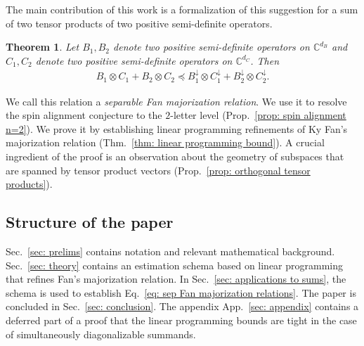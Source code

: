 \documentclass[12pt]{article}
\newtheorem{thm}{Theorem}[section]
\theoremstyle{definition}
\numberwithin{equation}{section}
\numberwithin{equation}{section}
\newcommand{\da}{\downarrow}
\newcommand{\bC}{\mathbb{C}}
\begin{document}
The main contribution of this work is a formalization of this suggestion for a sum of two tensor products of two positive semi-definite operators. 
\begin{thm}
\label{thm: sep Fan majorization}
Let \(B_1, B_2\) denote two positive semi-definite operators on \(\bC^{d_B}\) and \(C_1, C_2\) denote two positive semi-definite operators on \(\bC^{d_C}\). Then 
\begin{align}
\label{eq: sep Fan majorization relations}
B_1 \otimes C_1 + B_2 \otimes C_2 \preceq B_1^{\da} \otimes C_1^{\da} + B_2^{\da} \otimes C_2^{\da}.
\end{align}
\end{thm}


We call this relation a \textit{separable Fan majorization relation}. We use it to resolve the spin alignment conjecture to the \(2\)-letter level (Prop.~\ref{prop: spin alignment n=2}). We prove it by establishing linear programming refinements of Ky Fan's majorization relation (Thm.~\ref{thm: linear programming bound}). A crucial ingredient of the proof is an observation about the geometry of subspaces that are spanned by tensor product vectors (Prop.~\ref{prop: orthogonal tensor products}). 


\subsection{Structure of the paper}
Sec.~\ref{sec: prelims} contains notation and relevant mathematical background. Sec.~\ref{sec: theory} contains an estimation schema based on linear programming that refines Fan's majorization relation. In Sec.~\ref{sec: applications to sums}, the schema is used to establish Eq.~\ref{eq: sep Fan majorization relations}. The paper is concluded in Sec.~\ref{sec: conclusion}. The appendix App.~\ref{sec: appendix} contains a deferred part of a proof that the linear programming bounds are tight in the case of simultaneously diagonalizable summands. 
\end{document}

